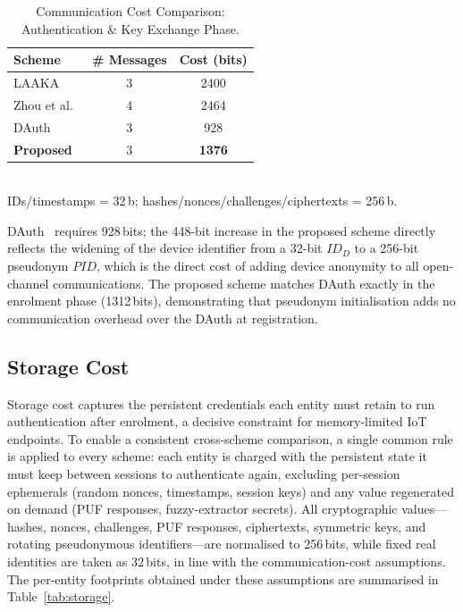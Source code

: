\begin{table}[!ht]
  \centering
  \caption{Communication Cost Comparison: Authentication \& Key Exchange Phase.}
  \label{tab:comm_auth}
  \small
  \setlength{\tabcolsep}{6pt}
  \begin{tabular}{lcc}
    \toprule
    Scheme & \# Messages & Cost (bits) \\
    \midrule
    LAAKA~\cite{ali2024laaka}          & 3 & 2400 \\
    Zhou et al.~\cite{zhou2024auth}    & 4 & 2464 \\
    DAuth~\cite{das2026comsnets}        & 3 & 928 \\
    \textbf{Proposed}                  & 3 & \textbf{1376} \\
    \bottomrule
  \end{tabular}\\[4pt]
  \small IDs/timestamps = 32\,b; hashes/nonces/challenges/ciphertexts = 256\,b.
\end{table}

DAuth~\cite{das2026comsnets} requires 928\,bits; the 448-bit increase in the proposed
scheme directly reflects the widening of the device identifier from a 32-bit $ID_D$
to a 256-bit pseudonym $\mathit{PID}$, which is the direct cost of adding device
anonymity to all open-channel communications.
The proposed scheme matches DAuth exactly in the enrolment phase (1312\,bits),
demonstrating that pseudonym initialisation adds no communication overhead over the
DAuth at registration.

\subsection{Storage Cost}

Storage cost captures the persistent credentials each entity must retain to run
authentication after enrolment, a decisive constraint for memory-limited IoT
endpoints.
To enable a consistent cross-scheme comparison, a single common rule is applied to
every scheme: each entity is charged with the persistent state it must keep between
sessions to authenticate again, excluding per-session ephemerals (random nonces,
timestamps, session keys) and any value regenerated on demand (PUF responses,
fuzzy-extractor secrets).
All cryptographic values---hashes, nonces, challenges, PUF responses, ciphertexts,
symmetric keys, and rotating pseudonymous identifiers---are normalised to 256\,bits,
while fixed real identities are taken as 32\,bits, in line with the
communication-cost assumptions.
The per-entity footprints obtained under these assumptions are summarised in
Table~\ref{tab:storage}.

